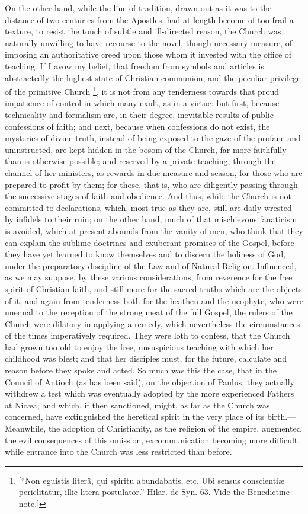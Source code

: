 On the other hand, while the line of tradition, drawn out as it was
to the distance of two centuries from the Apostles, had at length
become of too frail a texture, to resist the touch of subtle and
ill-directed reason, the Church was naturally unwilling to have
recourse to the novel, though necessary measure, of imposing an
authoritative creed upon those whom it invested with the office of
teaching. If I avow my belief, that freedom from symbols and articles
is abstractedly the highest state of Christian communion, and the
peculiar privilege of the primitive Church \footnote{[``Non eguistis literâ, qui spiritu abundabatis, etc. Ubi
sensus conscientiæ periclitatur, illic litera postulator.'' Hilar.
de Syn. 63. Vide the Benedictine note.]}, it is not from
any tenderness towards that proud impatience of control in which many
exult, as in a virtue: but first, because technicality and formalism
are, in their degree, inevitable results of public confessions of
faith; and next, because when confessions do not exist, the mysteries
of divine truth, instead of being exposed to the gaze of the profane
and uninstructed, are kept hidden in the bosom of the Church, far more
faithfully than is otherwise possible; and reserved by a private
teaching, through the channel of her ministers, as rewards in due
measure and season, for those who are prepared to profit by them; for
those, that is, who are diligently passing through the successive
stages of faith and obedience. And thus, while the Church is not
committed to declarations, which, most true as they are, still are
daily wrested by infidels to their ruin; on the other hand, much of
that mischievous fanaticism is avoided, which at present abounds from
the vanity of men, who think that they can explain the sublime
doctrines and exuberant promises of the Gospel, before they have yet
learned to know themselves and to discern the holiness of God, under
the preparatory discipline of the Law and of Natural Religion.
Influenced, as we may suppose, by these various considerations, from
reverence for the free spirit of Christian faith, and still more for
the sacred truths which are the objects of it, and again from
tenderness both for the heathen and the neophyte, who were unequal to
the reception of the strong meat of the full Gospel, the rulers of the
Church were dilatory in applying a remedy, which nevertheless the
circumstances of the times imperatively required. They were loth to
confess, that the Church had grown too old to enjoy the free,
unsuspicious teaching with which her childhood was blest; and that her
disciples must, for the future, calculate and reason before they spoke
and acted. So much was this the case, that in the Council of
Antioch (as has been said), on the objection of Paulus, they actually
withdrew a test which was eventually adopted by the more experienced
Fathers at Nicæa; and which, if then sanctioned, might, as far as the
Church was concerned, have extinguished the heretical spirit in the
very place of its birth.—Meanwhile, the adoption of Christianity, as
the religion of the empire, augmented the evil consequences of this
omission, excommunication becoming more difficult, while entrance into
the Church was less restricted than before.


